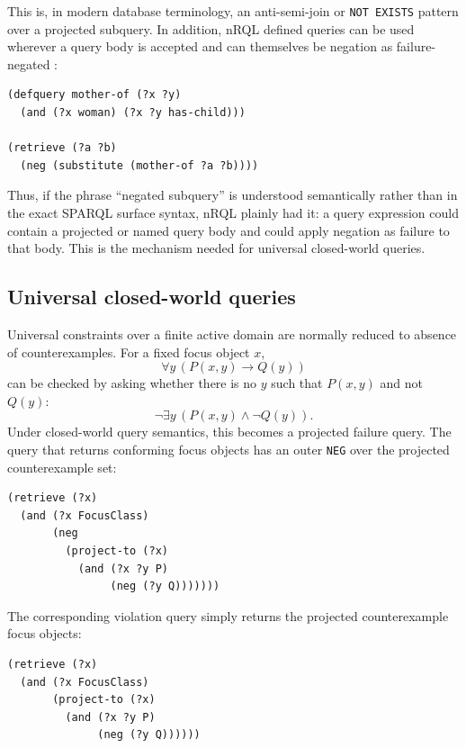 \documentclass[11pt,letterpaper]{article}
\newcommand{\nrql}{nRQL}
\newcommand{\naf}{negation as failure}
\begin{document}
This is, in modern database terminology, an anti-semi-join or \texttt{NOT EXISTS} pattern over a projected subquery. In addition, \nrql{} defined queries can be used wherever a query body is accepted and can themselves be \naf{}-negated \cite[pp.~120--122]{racerug}:

\begin{lstlisting}[language=nrql,caption={nRQL negation of a defined query body.}]
(defquery mother-of (?x ?y)
  (and (?x woman) (?x ?y has-child)))

(retrieve (?a ?b)
  (neg (substitute (mother-of ?a ?b))))
\end{lstlisting}

Thus, if the phrase ``negated subquery'' is understood semantically rather than in the exact SPARQL surface syntax, \nrql{} plainly had it: a query expression could contain a projected or named query body and could apply \naf{} to that body. This is the mechanism needed for universal closed-world queries.

\subsection{Universal closed-world queries}

Universal constraints over a finite active domain are normally reduced to absence of counterexamples. For a fixed focus object $x$,
\[
  \forall y\,(P(x,y) \rightarrow Q(y))
\]
can be checked by asking whether there is no $y$ such that $P(x,y)$ and not $Q(y)$:
\[
  \neg \exists y\,(P(x,y) \wedge \neg Q(y)).
\]
Under closed-world query semantics, this becomes a projected failure query. The query that returns conforming focus objects has an outer \texttt{NEG} over the projected counterexample set:

\begin{lstlisting}[language=nrql,caption={Closed-world universal condition by absence of counterexamples.}]
(retrieve (?x)
  (and (?x FocusClass)
       (neg
         (project-to (?x)
           (and (?x ?y P)
                (neg (?y Q)))))))
\end{lstlisting}

The corresponding violation query simply returns the projected counterexample focus objects:

\begin{lstlisting}[language=nrql,caption={Violation query for a failed closed-world universal condition.}]
(retrieve (?x)
  (and (?x FocusClass)
       (project-to (?x)
         (and (?x ?y P)
              (neg (?y Q))))))
\end{lstlisting}
\end{document}
